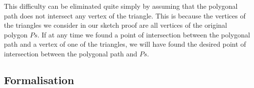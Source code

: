

This difficulty can be eliminated quite simply by assuming that the polygonal path does not intersect any vertex of the triangle. This is because the vertices of the triangles we consider in our sketch proof are all vertices of the original polygon $Ps$. If at any time we found a point of intersection between the polygonal path and a vertex of one of the triangles, we will have found the desired point of intersection between the polygonal path and $Ps$.\label{sec:NoVertexAssumption}


\subsection{Formalisation}


